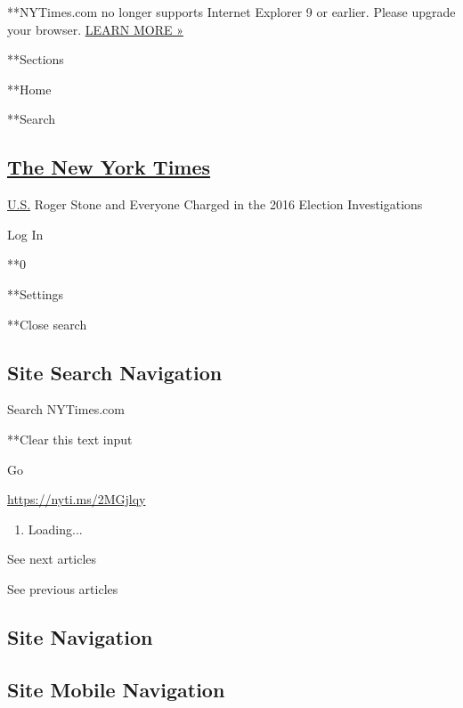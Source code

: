  **NYTimes.com no longer supports Internet Explorer 9 or earlier. Please
upgrade your browser.
\href{http://www.nytimes.com/content/help/site/ie9-support.html}{LEARN
MORE »}

**Sections

**Home

**Search

\hypertarget{the-new-york-times}{%
\subsection{\texorpdfstring{\href{http://www.nytimes.com/}{The New York
Times}}{The New York Times}}\label{the-new-york-times}}

 \href{https://www.nytimes.com/section/us}{U.S.} \textbar{}Roger Stone
and Everyone Charged in the 2016 Election Investigations

Log In

**0

**Settings

**Close search

\hypertarget{site-search-navigation}{%
\subsection{Site Search Navigation}\label{site-search-navigation}}

Search NYTimes.com

**Clear this text input

Go

\url{https://nyti.ms/2MGjlqy}

\begin{enumerate}
\def\labelenumi{\arabic{enumi}.}
\item
  Loading...
\end{enumerate}

See next articles

See previous articles

\hypertarget{site-navigation}{%
\subsection{Site Navigation}\label{site-navigation}}

\hypertarget{site-mobile-navigation}{%
\subsection{Site Mobile Navigation}\label{site-mobile-navigation}}

